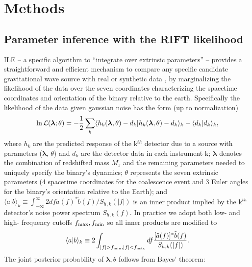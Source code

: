 \documentclass[twocolumn,prd,nofootinbib]{revtex4}
\newcommand\ILE{ILE}
\begin{document}
\section{Methods}
\label{sec:methods}

\subsection{Parameter inference with the RIFT likelihood}
\ILE{}  -- a specific algorithm to ``integrate over extrinsic parameters'' -- provides a straightforward and efficient mechanism to compare any specific candidate gravitational wave source with
real or synthetic data   \cite{gwastro-PE-AlternativeArchitectures,NRPaper,2017PhRvD..96j4041L,2017CQGra..34n4002O},
by marginalizing the likelihood of the data over the seven coordinates characterizing the spacetime coordinates and
orientation of the binary relative to the earth.  
Specifically the likelihood of the data given gaussian noise has the form  (up to normalization)
\begin{equation}
\label{eq:lnL}
\ln {\cal L}(\bm{\lambda} ;\theta )=-\frac{1}{2}\sum\limits_{k}\langle h_{k}(\bm{\lambda} ,\theta )-d_{k} |h_{k}(\bm{\lambda} ,\theta )-d_{k}\rangle _{k}-\langle d_{k}|d_{k}\rangle _{k},
\end{equation}
where $h_{k}$ are the predicted response of the k$^{th}$ detector due to a source with parameters ($\bm{\lambda}$, $\theta$) and
$d_{k}$ are the detector data in each instrument k; $\bm{\lambda}$ denotes the combination of redshifted mass $M_{z}$ and the
remaining parameters needed to uniquely specify the binary's dynamics; $\theta$ represents the
seven extrinsic parameters (4 spacetime coordinates for the coalescence event and 3 Euler angles for the binary's
orientation relative to the Earth); and $\langle a|b\rangle_{k}\equiv
\int_{-\infty}^{\infty}2df\tilde{a}(f)^{*}\tilde{b}(f)/S_{h,k}(|f|)$ is an inner product implied by the k$^{th}$ detector's
noise power spectrum $S_{h,k}(f)$. 
In practice we adopt both  low- and high- frequency cutoffs $f_{\rm max},f_{\rm min}$ so all inner products are modified to
\begin{equation}
\label{eq:overlap}
\langle a|b\rangle_{k}\equiv 2 \int_{|f|>f_{\rm min},|f|<f_{\rm max}}df\frac{[\tilde{a}(f)]^{*}\tilde{b}(f)}{S_{h,k}(|f|)}.
\end{equation}
The joint posterior probability of $\bm{\lambda} ,\theta$ follows from Bayes' theorem:
\end{document}
